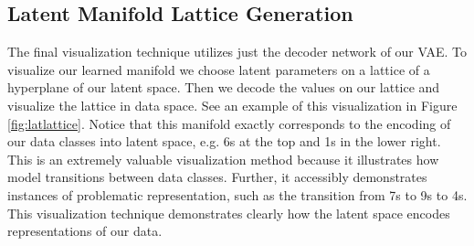 \documentclass{article} %
\numberwithin{figure}{section}
\begin{document}
\subsection{Latent Manifold Lattice Generation}
\begin{wrapfigure}{L}{0.5\textwidth}
    }
    \caption{Latent Manifold Visualization}
    \label{fig:latlattice}
\end{wrapfigure}
The final visualization technique utilizes just the decoder network of our VAE. To visualize our learned manifold we choose latent parameters on a lattice of a hyperplane of our latent space. Then we decode the values on our lattice and visualize the lattice in data space. See an example of this visualization in Figure \ref{fig:latlattice}. Notice that this manifold exactly corresponds to the encoding of our data classes into latent space, e.g. 6s at the top and 1s in the lower right. This is an extremely valuable visualization method because it illustrates how model transitions between data classes. Further, it accessibly demonstrates instances of problematic representation, such as the transition from 7s to 9s to 4s. This visualization technique demonstrates clearly how the latent space encodes representations of our data.




\end{document}
